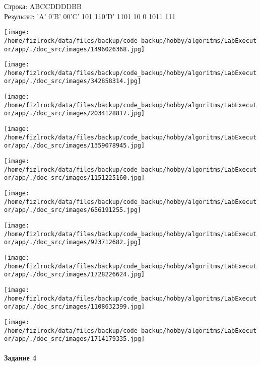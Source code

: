 \documentclass[a4paper, 12pt]{article}
\begin{document}
Строка: 
ABCCDDDDBB\\
Результат: 'A' 0'B' 00'C' 101 110'D' 1101 10 0 1011 111

\texttt{[image: /home/fizlrock/data/files/backup/code\_backup/hobby/algoritms/LabExecutor/app/./doc\_src/images/1496026368.jpg]}

\texttt{[image: /home/fizlrock/data/files/backup/code\_backup/hobby/algoritms/LabExecutor/app/./doc\_src/images/342858314.jpg]}

\texttt{[image: /home/fizlrock/data/files/backup/code\_backup/hobby/algoritms/LabExecutor/app/./doc\_src/images/2034128817.jpg]}

\texttt{[image: /home/fizlrock/data/files/backup/code\_backup/hobby/algoritms/LabExecutor/app/./doc\_src/images/1359078945.jpg]}

\texttt{[image: /home/fizlrock/data/files/backup/code\_backup/hobby/algoritms/LabExecutor/app/./doc\_src/images/1151225160.jpg]}

\texttt{[image: /home/fizlrock/data/files/backup/code\_backup/hobby/algoritms/LabExecutor/app/./doc\_src/images/656191255.jpg]}

\texttt{[image: /home/fizlrock/data/files/backup/code\_backup/hobby/algoritms/LabExecutor/app/./doc\_src/images/923712682.jpg]}

\texttt{[image: /home/fizlrock/data/files/backup/code\_backup/hobby/algoritms/LabExecutor/app/./doc\_src/images/1728226624.jpg]}

\texttt{[image: /home/fizlrock/data/files/backup/code\_backup/hobby/algoritms/LabExecutor/app/./doc\_src/images/1108632399.jpg]}

\texttt{[image: /home/fizlrock/data/files/backup/code\_backup/hobby/algoritms/LabExecutor/app/./doc\_src/images/1714179335.jpg]}
\pagebreak
\paragraph{Задание 4}
\end{document}
